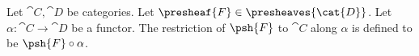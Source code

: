 \begin{definition}[Restriction]
Let $\cat{C},\cat{D}$ be categories.
Let $\presheaf{F} \in \presheaves{\cat{D}}$.
Let $\alpha: \cat{C}\rightarrow \cat{D}$ be a functor.
The restriction of $\psh{F}$ to $\cat{C}$ along $\alpha$
is defined to be $\psh{F} \circ \alpha$.
\end{definition}